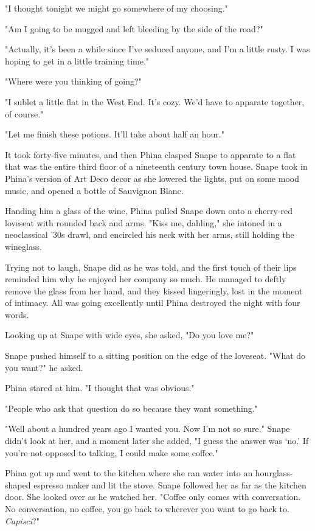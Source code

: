 "I thought tonight we might go somewhere of my choosing."

"Am I going to be mugged and left bleeding by the side of the road?"

"Actually, it's been a while since I've seduced anyone, and I'm a little rusty. I was hoping to get in a little training time."

"Where were you thinking of going?"

"I sublet a little flat in the West End. It's cozy. We'd have to apparate together, of course."

"Let me finish these potions. It'll take about half an hour."

It took forty-five minutes, and then Phina clasped Snape to apparate to a flat that was the entire third floor of a nineteenth century town house. Snape took in Phina's version of Art Deco decor as she lowered the lights, put on some mood music, and opened a bottle of Sauvignon Blanc.

Handing him a glass of the wine, Phina pulled Snape down onto a cherry-red loveseat with rounded back and arms. "Kiss me, dahling," she intoned in a neoclassical '30s drawl, and encircled his neck with her arms, still holding the wineglass.

Trying not to laugh, Snape did as he was told, and the first touch of their lips reminded him why he enjoyed her company so much. He managed to deftly remove the glass from her hand, and they kissed lingeringly, lost in the moment of intimacy. All was going excellently until Phina destroyed the night with four words.

Looking up at Snape with wide eyes, she asked, "Do you love me?"

Snape pushed himself to a sitting position on the edge of the loveseat. "What do you want?" he asked.

Phina stared at him. "I thought that was obvious."

"People who ask that question do so because they want something."

"Well about a hundred years ago I wanted you. Now I'm not so sure." Snape didn't look at her, and a moment later she added, "I guess the answer was `no.' If you're not opposed to talking, I could make some coffee."

Phina got up and went to the kitchen where she ran water into an hourglass-shaped espresso maker and lit the stove. Snape followed her as far as the kitchen door. She looked over as he watched her. "Coffee only comes with conversation. No conversation, no coffee, you go back to wherever you want to go back to. \emph{Capisci}?"

